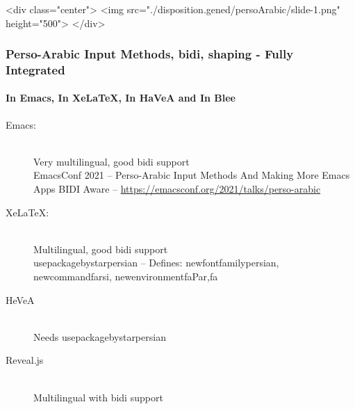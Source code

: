 \begin{whenOrg}
\begin{htmlonly}

\begin{frame}[fragile,plain,label=persoArabic]
    \frametitle{}
    \framesubtitle{}
    \begin{rawhtml}
<div class="center">
<img src="./disposition.gened/persoArabic/slide-1.png" height="500">
</div>
    \end{rawhtml}
\end{frame}
\end{htmlonly}

\begin{verblatex}

\begin{frame}[fragile,plain,label=persoArabic]
    \frametitle{Perso-Arabic Input Methods, bidi, shaping - Fully Integrated}
    \framesubtitle{In Emacs, In XeLaTeX, In HaVeA and In Blee}

    \begin{description}
      \item[Emacs:]   \hfill \\
        Very multilingual, good bidi support\\
        EmacsConf 2021 -- Perso-Arabic Input Methods And Making More Emacs Apps BIDI Aware -- \url{https://emacsconf.org/2021/talks/perso-arabic}
      \item[XeLaTeX:]   \hfill \\
        Multilingual, good bidi support\\
        usepackage{bystarpersian}  -- Defines: newfontfamily{persian}, newcommand{farsi}, newenvironment{faPar},{fa}
      \item[HeVeA]   \hfill \\
        Needs usepackage{bystarpersian}
      \item[Reveal.js]   \hfill \\
        Multilingual with bidi support\\
    \end{description}


\end{frame}
\end{verblatex}
\end{whenOrg}
